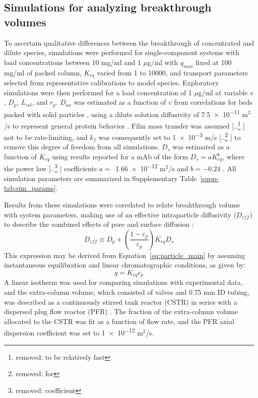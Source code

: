 \documentclass[preprint,review,12pt]{elsarticle}
\providecommand{\DIFaddtex}[1]{{\protect\color{blue} \sf #1}} %
\providecommand{\DIFdeltex}[1]{{\protect\color{red} [..\footnote{removed: #1} ]}} %
\providecommand{\DIFaddbegin}{} %
\providecommand{\DIFaddend}{} %
\providecommand{\DIFdelbegin}{} %
\providecommand{\DIFdelend}{} %
\providecommand{\DIFadd}[1]{\texorpdfstring{\DIFaddtex{#1}}{#1}} %
\providecommand{\DIFdel}[1]{\texorpdfstring{\DIFdeltex{#1}}{}} %
\begin{document}
    \subsection{Simulations for analyzing breakthrough volumes} \label{ssec:sims_explor}
        To ascertain qualitative differences between the breakthrough of concentrated and dilute species, simulations were performed for single-component systems with load concentrations between 10 mg/ml and 1 $\mu$g/ml with $q_{max}$ fixed at  100 mg/ml of packed column, $K_{eq}$ varied from 1 to 10000, and transport parameters selected from representative calibrations to model species. Exploratory simulations were then performed for a load concentration of 1 $\mu$g/ml at variable $v$, $D_p$, $L_{col}$, and $r_p$. $D_{ax}$ was estimated as a function of $v$ from correlations for beds packed with solid particles \cite{Han1985}, using a dilute solution diffusivity of \num{7.5e-11} m$^2$/s to represent general protein behavior \cite{Young1980}. Film mass transfer was assumed \DIFdelbegin \DIFdel{to be relatively fast}\DIFdelend \DIFaddbegin \DIFadd{not to be rate-limiting}\DIFaddend , and $k_f$ was \DIFaddbegin \DIFadd{consequently }\DIFaddend set to \num{1e-3} m/s \DIFdelbegin \DIFdel{for }\DIFdelend \DIFaddbegin \DIFadd{to remove this degree of freedom from }\DIFaddend all simulations. $D_s$ was estimated as a function of $K_{eq}$ using results reported for a mAb of the form $D_s = a K_{eq}^b$, where the power law \DIFdelbegin \DIFdel{coefficient }\DIFdelend \DIFaddbegin \DIFadd{coefficients }\DIFaddend $a =$~\num{1.66e-12} m$^2$/s and $b = -0.24$ \cite{Khanal7004}. \DIFaddbegin \DIFadd{All simulation parameters are summarized in Supplementary Table~\ref{supp-tab:sim_params}.
}


        \DIFaddend Results from these simulations were correlated to relate breakthrough volume with system parameters, making use of an effective intraparticle diffusivity ($D_{eff}$) to describe the combined effects of pore and surface diffusion \cite{Yoshida1994}:
        \begin{equation} \label{eq:d_eff}
            D_{eff} \equiv D_p + \left( \frac{1 - \varepsilon_p}{\varepsilon_p} \right) K_{eq} D_s
        \end{equation}
        This expression may be derived from Equation~\ref{eq:particle_main} by assuming instantaneous equilibration and linear chromatographic conditions, as given by:
        \begin{equation} \label{eq:linear_ss}
            q = K_{eq} c_p
        \end{equation}
        A linear isotherm was used for comparing simulations with experimental data, and the extra-column volume, which consisted of valves and 0.75 mm ID tubing, was described as a continuously stirred tank reactor (CSTR) in series with a dispersed plug flow reactor (PFR) \cite{Kumar2015}. The fraction of the extra-column volume allocated to the CSTR was fit as a function of flow rate, and the PFR axial dispersion coefficient was set to \num{1e-12} m$^2$/s.
\end{document}
